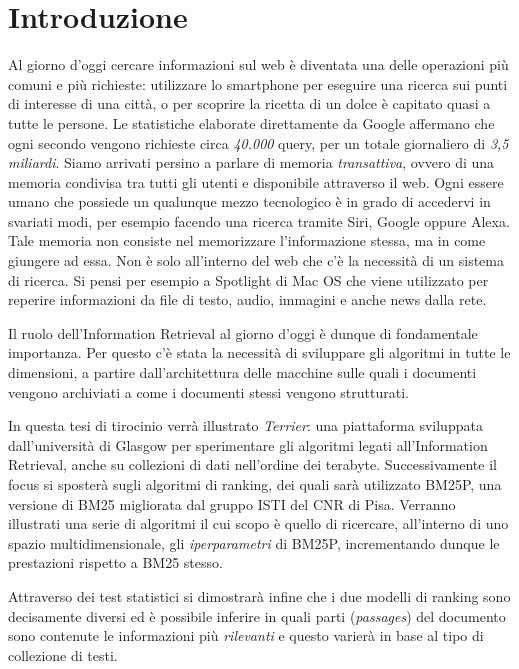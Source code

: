 \chapter{Introduzione}
Al giorno d'oggi cercare informazioni sul web è diventata una delle operazioni più comuni e più richieste:
utilizzare lo smartphone per eseguire una ricerca sui punti di interesse di una città, o per scoprire la ricetta di un dolce è capitato quasi a tutte le persone.
Le statistiche elaborate direttamente da Google affermano che ogni secondo vengono richieste circa \textit{40.000} query, per un totale
giornaliero di \textit{3,5 miliardi}.
Siamo arrivati persino a parlare di memoria \textit{transattiva}, ovvero di una memoria condivisa tra tutti gli utenti e disponibile attraverso il web.
Ogni essere umano che possiede un qualunque mezzo tecnologico è in grado di accedervi in svariati modi, per esempio facendo una ricerca tramite Siri, Google oppure Alexa.
Tale memoria non consiste nel memorizzare l'informazione stessa, ma in come giungere ad essa.
Non è solo all'interno del web che c'è la necessità di un sistema di ricerca. Si pensi per esempio a Spotlight di Mac OS che
viene utilizzato per reperire informazioni da file di testo, audio, immagini e anche news dalla rete.

Il ruolo dell'Information Retrieval al giorno d'oggi è dunque di fondamentale importanza.
Per questo c'è stata la necessità di sviluppare gli algoritmi in tutte le dimensioni, a partire dall'architettura delle macchine sulle quali i documenti vengono archiviati a come i documenti stessi vengono strutturati.

In questa tesi di tirocinio verrà illustrato \textit{Terrier}: una piattaforma sviluppata dall'università di Glasgow
per sperimentare gli algoritmi legati all'Information Retrieval, anche su collezioni di dati nell'ordine dei terabyte.  Successivamente il focus si sposterà
sugli algoritmi di ranking, dei quali sarà utilizzato BM25P, una versione di BM25 migliorata dal gruppo ISTI del CNR di Pisa.
Verranno illustrati una serie di algoritmi il cui scopo è quello di ricercare, all'interno di uno spazio multidimensionale,
gli \textit{iperparametri} di BM25P, incrementando dunque le prestazioni rispetto a BM25 stesso.

Attraverso dei test statistici si dimostrarà infine che i due modelli di ranking sono decisamente diversi ed è possibile
inferire in quali parti (\textit{passages}) del documento sono contenute le informazioni più \textit{rilevanti}
e questo varierà in base al tipo di collezione di testi.

